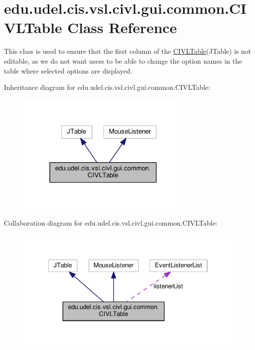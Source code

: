 \hypertarget{classedu_1_1udel_1_1cis_1_1vsl_1_1civl_1_1gui_1_1common_1_1CIVLTable}{}\section{edu.\+udel.\+cis.\+vsl.\+civl.\+gui.\+common.\+C\+I\+V\+L\+Table Class Reference}
\label{classedu_1_1udel_1_1cis_1_1vsl_1_1civl_1_1gui_1_1common_1_1CIVLTable}


This class is used to ensure that the first column of the {\ttfamily \hyperlink{classedu_1_1udel_1_1cis_1_1vsl_1_1civl_1_1gui_1_1common_1_1CIVLTable}{C\+I\+V\+L\+Table}}(J\+Table) is not editable, as we do not want users to be able to change the option names in the table where selected options are displayed.  




Inheritance diagram for edu.\+udel.\+cis.\+vsl.\+civl.\+gui.\+common.\+C\+I\+V\+L\+Table\+:
\nopagebreak
\begin{figure}[H]
\begin{center}
\leavevmode
\includegraphics[width=242pt]{classedu_1_1udel_1_1cis_1_1vsl_1_1civl_1_1gui_1_1common_1_1CIVLTable__inherit__graph}
\end{center}
\end{figure}


Collaboration diagram for edu.\+udel.\+cis.\+vsl.\+civl.\+gui.\+common.\+C\+I\+V\+L\+Table\+:
\nopagebreak
\begin{figure}[H]
\begin{center}
\leavevmode
\includegraphics[width=334pt]{classedu_1_1udel_1_1cis_1_1vsl_1_1civl_1_1gui_1_1common_1_1CIVLTable__coll__graph}
\end{center}
\end{figure}
